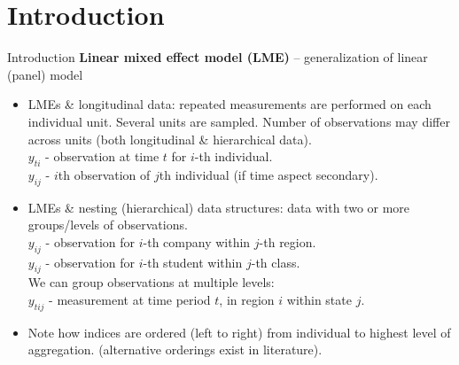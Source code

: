 \documentclass{beamer}
\begin{document}
\section{Introduction}
\begin{frame}{Introduction}
\small 
\textbf{Linear mixed effect model (LME)} -- generalization of linear (panel) model
\medskip
\begin{itemize}
\item LMEs \& longitudinal data: repeated measurements are performed on each individual  unit. Several units are sampled. Number of observations may differ across units (both longitudinal \& hierarchical data).\\ \smallskip
\quad $y_{ti}$ - observation at time $t$ for $i$-th individual. \\  
\quad $y_{ij}$ - $i$th observation of $j$th individual (if time aspect secondary). \\ 
\bigskip
\item LMEs \& nesting (hierarchical) data structures: data with two or more groups/levels of observations. \\ \smallskip
\quad $y_{ij}$ - observation for $i$-th company within $j$-th region. \\ 
\quad $y_{ij}$ - observation for $i$-th student within $j$-th class. \\ 
\medskip
We can group observations at multiple levels:\\
\smallskip
\quad $y_{tij}$ - measurement at time period $t$,  in region $i$ within state $j$.\\ 
\bigskip
\item Note how indices are ordered (left to right) from individual to highest level of aggregation. (alternative orderings exist in literature).
\end{itemize}
\end{frame}
\end{document}
